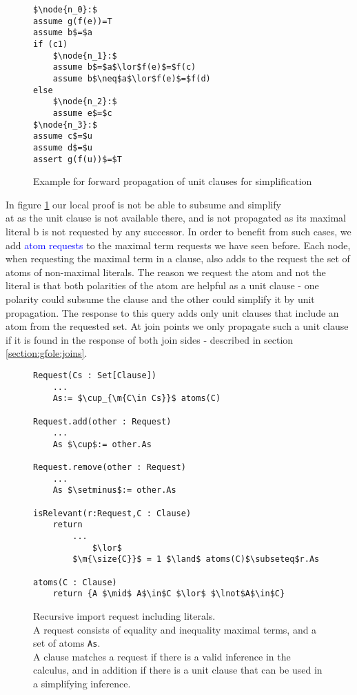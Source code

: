 \begin{figure}
\begin{lstlisting}
$\node{n_0}:$
assume g(f(e))=T
assume b$=$a
if (c1)
	$\node{n_1}:$	
	assume b$=$a$\lor$f(e)$=$f(c)
	assume b$\neq$a$\lor$f(e)$=$f(d)
else	
	$\node{n_2}:$
	assume e$=$c
$\node{n_3}:$
assume c$=$u
assume d$=$u
assert g(f(u))$=$T
\end{lstlisting}
\caption{Example for forward propagation of unit clauses for simplification\\
}
\label{snippet4.1.2.2}
\end{figure}

In figure \ref{snippet4.1.2.2} our local proof is not be able to subsume
 and simplify\\  at  as the unit clause  is not available there, and is not propagated as its maximal literal b is not requested by any successor.
In order to benefit from such cases, we add \textcolor{blue}{atom requests} to the maximal term requests we have seen before.
Each node, when requesting the maximal term in a clause, also adds to the request the set of atoms of non-maximal literals.
The reason we request the atom and not the literal is that both polarities of the atom are helpful as a unit clause - one polarity could subsume the clause and the other could simplify it by unit propagation.
The response to this query adds only unit clauses that include an atom from the requested set. 
At join points we only propagate such a unit clause if it is found in the response of both join sides - described in section \ref{section:gfole:joins}.

\begin{figure}
\begin{lstlisting}
Request(Cs : Set[Clause])
	...
	As:= $\cup_{\m{C\in Cs}}$ atoms(C)
	
Request.add(other : Request)
	...
	As $\cup$:= other.As
	
Request.remove(other : Request)
	...
	As $\setminus$:= other.As

isRelevant(r:Request,C : Clause)
	return 
		...
			$\lor$
		$\m{\size{C}}$ = 1 $\land$ atoms(C)$\subseteq$r.As
			
atoms(C : Clause)
	return {A $\mid$ A$\in$C $\lor$ $\lnot$A$\in$C}
\end{lstlisting}
\caption{Recursive import request including literals.\\
A request consists of equality and inequality maximal terms, and a set of atoms \lstinline|As|.\\
A clause matches a request if there is a valid inference in the calculus,
and in addition if there is a unit clause that can be used in a simplifying inference.\\
}
\label{basic_verification.4.request_literals}
\end{figure}

